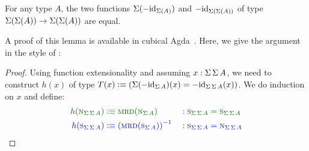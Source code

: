 \documentclass[english,a4paper]{lmcs}
\begin{document}
\begin{lem} \label{lem:susp-neg-commute}
	For any type $A$, the two functions $\operatorname{\Sigma}(-\mathord{\mathrm{id}}_{\operatorname{\Sigma}(A)})$ and $-\mathord{\mathrm{id}}_{\operatorname{\Sigma}(\operatorname{\Sigma}(A))}$ of type $\operatorname{\Sigma}(\operatorname{\Sigma}(A)) \to \operatorname{\Sigma}(\operatorname{\Sigma}(A))$ are equal.
\end{lem}
A proof of this lemma is available in cubical Agda~\cite{doublesusp}.
Here, we give the argument in the style of \cite{HoTT}:
\begin{proof}
  \def\cg{\color{darkgreen}}
  \def\cb{\color{darkblue}}
  Using function extensionality and assuming $x : \operatorname{\Sigma}\operatorname{\Sigma} A$,
  we need to construct $h(x)$ of type
  $T(x) \vcentcolon\equiv ( \operatorname{\Sigma}(-\mathord{\mathrm{id}}_{\operatorname{\Sigma} A})(x) = -\mathord{\mathrm{id}}_{\operatorname{\Sigma}{\operatorname{\Sigma} A}}(x) )$.
  We do induction on $x$ and define:
  \begin{alignat}{2}
    \cg h(\north_{\susp\susp A})
    & \cg \defequi \mrd(\north_{\susp A})
    && \cg : \south_{\susp\susp A} = \south_{\susp\susp A}
    \label{eq:green}
    \\
    \cb h(\south_{\susp\susp A})
    & \cb \defequi \inv{\left(\mrd(\south_{\susp A})\right)}
    && \cb : \south_{\susp\susp A} = \north_{\susp\susp A}
    \label{eq:blue}
  \end{alignat}


\end{proof}
\end{document}
